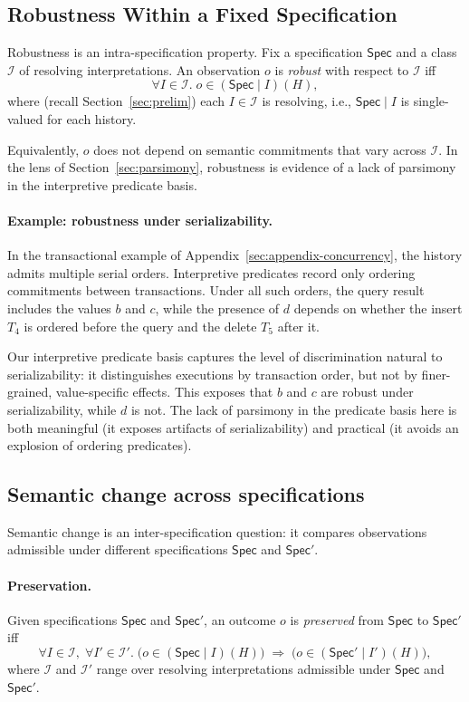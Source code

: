\documentclass[acmsmall,nonacm]{acmart}
\theoremstyle{remark}
\numberwithin{definition}{section}
\numberwithin{theorem}{section}
\numberwithin{lemma}{section}
\numberwithin{corollary}{section}
\numberwithin{remark}{section}
\numberwithin{example}{section}
\numberwithin{observation}{section}
\numberwithin{assumption}{section}
\newcommand{\Spec}{\mathsf{Spec}}
\begin{document}
\subsection{Robustness Within a Fixed Specification}

Robustness is an intra-specification property.
Fix a specification $\Spec$ and a class $\mathcal{I}$ of resolving interpretations.
An observation $o$ is \emph{robust} with respect to $\mathcal{I}$ iff
\[
  \forall I \in \mathcal{I}.\; o \in (\Spec \mid I)(H),
\]
where (recall Section~\ref{sec:prelim}) each $I \in \mathcal{I}$ is resolving, i.e., $\Spec \mid I$ is single-valued for each history.

Equivalently, $o$ does not depend on semantic commitments that vary across
$\mathcal{I}$.
In the lens of Section~\ref{sec:parsimony}, robustness is evidence of a lack of
parsimony in the interpretive predicate basis.

\paragraph{Example: robustness under serializability.}
In the transactional example of
Appendix~\ref{sec:appendix-concurrency}, the history admits multiple serial orders.
Interpretive predicates record only ordering commitments between transactions.
Under all such orders, the query result includes the values $b$ and $c$, while the
presence of $d$ depends on whether the insert $T_4$ is ordered before the query
and the delete $T_5$ after it.

Our interpretive predicate basis captures the level of discrimination natural to
serializability: it distinguishes executions by transaction order, but not by
finer-grained, value-specific effects.
This exposes that $b$ and $c$ are robust under serializability, while $d$ is not.
The lack of parsimony in the predicate basis here is both meaningful (it exposes artifacts of serializability)
and practical (it avoids an explosion of ordering predicates).

\subsection{Semantic change across specifications}
\label{sec:semantic-change}

Semantic change is an inter-specification question: it compares observations
admissible under different specifications $\Spec$ and $\Spec'$.

\paragraph{Preservation.}
Given specifications $\Spec$ and $\Spec'$, an outcome $o$ is \emph{preserved}
from $\Spec$ to $\Spec'$ iff
\[
  \forall I \in \mathcal{I},\; \forall I' \in \mathcal{I}'.\;
  \bigl(o \in (\Spec \mid I)(H)\bigr)
  \;\Rightarrow\;
  \bigl(o \in (\Spec' \mid I')(H)\bigr),
\]
where $\mathcal{I}$ and $\mathcal{I}'$ range over resolving interpretations
admissible under $\Spec$ and $\Spec'$.
\end{document}
